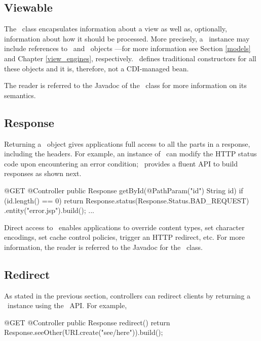 \subsection{Viewable}
\label{viewable}

The \Viewable\ class encapsulates information about a view as well as, optionally, 
information about how it  should be processed. More precisely, a \Viewable\ instance 
may include references to \Models\ and \ViewEngine\ objects ---for more information 
see Section \ref{models} and Chapter \ref{view_engines}, respectively. 
\Viewable\ defines traditional constructors for all these objects and it is, therefore, 
not a CDI-managed bean.

The reader is referred to the Javadoc of the \Viewable\ class for more information on its semantics.

\subsection{Response}
\label{response}

Returning a \Response\ object gives applications full access to all the parts in a response, 
including the headers. For example, an instance of  \Response\ can modify the HTTP status
code upon encountering an error condition; \jaxrs\ provides a fluent API to build responses
as shown next.

\begin{listing}{1}
@GET
@Controller
public Response getById(@PathParam("id") String id) {
    if (id.length() == 0) {
   	    return Response.status(Response.Status.BAD_REQUEST)
   	                   .entity("error.jsp").build();
    } 
    ...
}
\end{listing}

Direct access to \Response\ enables applications to override content types, set character
encodings, set cache control policies, trigger an HTTP redirect, etc. For more information, 
the reader is referred to the Javadoc for the \Response\ class.

\subsection{Redirect}
\label{redirect}
 
As stated in the previous section, controllers can redirect clients by returning a \Response\
instance using the \jaxrs\ API. For example,

\begin{listing}{1}
@GET
@Controller
public Response redirect() {
    return Response.seeOther(URI.create("see/here")).build();
}
\end{listing}

